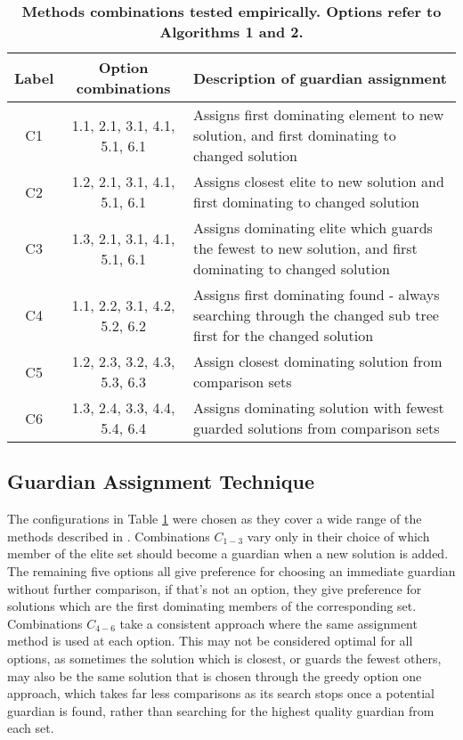 \documentclass{ecmm427_assignment}
\begin{document}
\begin{table}[h]
    \centering
\begin{center}
    \begin{tabular}{| c | c | p{10cm} |}
    \hline
    Label & Option combinations & Description of guardian assignment \\ \hline
    C1 & 1.1, 2.1, 3.1, 4.1, 5.1, 6.1 & Assigns first dominating element to new solution, and first dominating to changed solution \\ \hline
    C2 & 1.2, 2.1, 3.1, 4.1, 5.1, 6.1 & Assigns closest elite to new solution and first dominating to changed solution \\ \hline
    C3 & 1.3, 2.1, 3.1, 4.1, 5.1, 6.1 & Assigns dominating elite which guards the fewest to new solution, and first dominating to changed solution \\ \hline
    C4 & 1.1, 2.2, 3.1, 4.2, 5.2, 6.2 & Assigns first dominating found - always searching through the changed sub tree first for the changed solution \\ \hline
    C5 & 1.2, 2.3, 3.2, 4.3, 5.3, 6.3 & Assign closest dominating solution from comparison sets \\ \hline
    C6 & 1.3, 2.4, 3.3, 4.4, 5.4, 6.4 & Assigns dominating solution with fewest guarded solutions from comparison sets \\
    \hline
    \end{tabular}
    \caption{\textbf{Methods combinations tested empirically. Options refer to Algorithms 1 and 2.}}
\label{table:combinations}
\end{center}
\end{table}

\subsection{Guardian Assignment Technique}
The configurations in Table \ref{table:combinations} were chosen as they cover a wide range of the methods described in \cite{Fieldsend2014}. Combinations $C_{1-3}$ vary only in their choice of which member of the elite set should become a guardian when a new solution is added. The remaining five options all give preference for choosing an immediate guardian without further comparison, if that's not an option, they give preference for solutions which are the first dominating members of the corresponding set.\\
Combinations $C_{4-6}$ take a consistent approach where the same assignment method is used at each option. This may not be considered optimal for all options, as sometimes the solution which is closest, or guards the fewest others, may also be the same solution that is chosen through the greedy option one approach, which takes far less comparisons as its search stops once a potential guardian is found, rather than searching for the highest quality guardian from each set.
\end{document}
